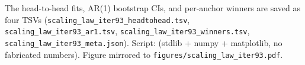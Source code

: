 The head-to-head fits, AR(1) bootstrap CIs, and per-anchor winners are
saved as four TSVs (\texttt{scaling\_law\_iter93\_headtohead.tsv},
\texttt{scaling\_law\_iter93\_ar1.tsv},
\texttt{scaling\_law\_iter93\_winners.tsv},
\texttt{scaling\_law\_iter93\_meta.json}).  Script:
 (stdlib + numpy +
matplotlib, no fabricated numbers).  Figure mirrored to
\texttt{figures/scaling\_law\_iter93.pdf}.

